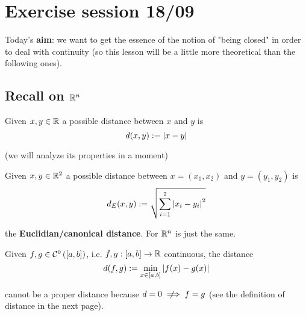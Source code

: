
\chapter{Exercise session 18/09} %
\label{cha:exercise_session_18_09}
\thispagestyle{empty}

Today's \textbf{aim}: we want to get the essence of the notion of "being closed" in order to deal with continuity (so this lesson will be a little more theoretical than the following ones).

\section{Recall on \texorpdfstring{$\mathbb{R}^n$}{C}} %
\label{sec:recall_on_rr^n_c_}

Given $x,y\in\mathbb{R}$ a possible distance between $x$ and $y$ is
\begin{equation*}
    d(x,y):=\left\lvert x-y \right\rvert
\end{equation*}

(we will analyze its properties in a moment)

Given $x,y\in\mathbb{R}^2$ a possible distance between $x=(x_1,x_2)$ and $y=(y_1,y_2)$ is
\begin{equation*}
    d_E(x,y):=\sqrt{\sum_{i=1}^2\left\lvert x_i-y_i \right\rvert^2}
\end{equation*}

the \textbf{Euclidian/canonical distance}. For $\mathbb{R}^n$ is just the same.

Given $f,g\in\mathcal{C}^0\left([a,b] \right)$, i.e. $f,g:[a,b]\to\mathbb{R}$ continuous, the distance
\begin{equation*}
    d(f,g):=\min_{x\in[a,b]} \left\lvert f(x)-g(x) \right\rvert
\end{equation*}

cannot be a proper distance because $d=0 \notimplies f=g$ (see the definition of distance in the next page).










